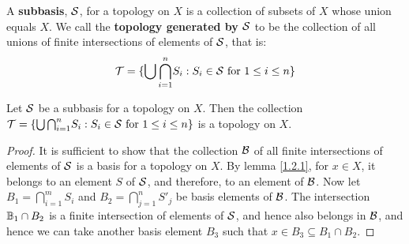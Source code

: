 \begin{definition}
    A \textbf{subbasis}, $\mathcal{S}$, for a topology on  $X$ is a collection of subsets of $X$ whose 
    union equals $X$. We call the \textbf{topology generated by $\mathcal{S}$} to be the collection 
    of all unions of finite intersections of elements of $\mathcal{S}$, that is:
        \begin{equation*}
            \mathcal{T}=\{\bigcup{\bigcap_{i=1}^{n}}{S_i}: S_i \in \mathcal{S} \text{ for } 1 \leq i \leq n\}
        \end{equation*}
\end{definition}

\begin{theorem}\label{1.2.5}
    Let $\mathcal{S}$ be a subbasis for a topology on  $X$. Then the collection $\mathcal{T}=\{\bigcup{\bigcap_{i=1}^{n}}{S_i}: 
    S_i \in \mathcal{S} \text{ for } 1 \leq i \leq n\}$ is a topology on $X$.
\end{theorem}
\begin{proof}
    It is sufficient to show that the collection $\mathcal{B}$ of all finite intersections of elements 
    of $\mathcal{S}$ is a basis for a topology on  $X$. By lemma \ref{1.2.1}, for $x \in X$, it belongs to 
    an element  $S$ of  $\mathcal{S}$, and therefore, to an element of  $\mathcal{B}$. Now let  $B_1=\bigcap_{i=1}^m{S_i}$ 
    and $B_2=\bigcap_{j=1}^{n}{S'_j}$ be basis elements of $\mathcal{B}$. The intersection  $\mathbb{B}_1 \cap B_2$ is a 
    finite intersection of elements of $\mathcal{S}$, and hence also belongs in  $\mathcal{B}$, and hence we can take 
    another basis element  $B_3$ such that $x \in B_3 \subseteq B_1 \cap B_2$.
\end{proof}
